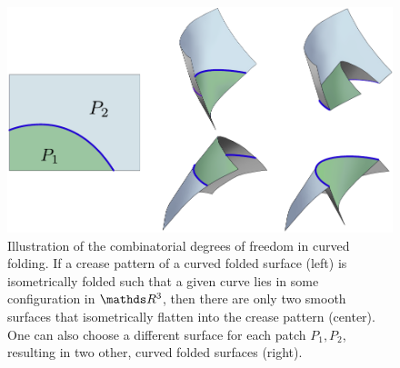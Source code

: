 \begin{figure} [t]
	\centering
	\includegraphics[width=\linewidth]{figures/curved_fold_through_curve_1.pdf}
	\caption{Illustration of the combinatorial degrees of freedom in curved folding. If a crease pattern of a curved folded surface (left) is isometrically folded such that a given curve lies in some configuration in $\R^3$, then there are only two smooth surfaces that isometrically flatten into the crease pattern (center). One can also choose a different surface for each patch $P_1,P_2$, resulting in two other, curved folded surfaces (right).}
	\label{fig:folding_combinatorics}
\end{figure}

